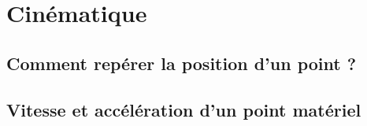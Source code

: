 \documentclass[13pt, twoside, a4paper, french]{report}
\begin{document}
\chapter{Cinématique}\label{ch:cinematique}
  
  
  \section{Comment repérer la position d’un point ?}\label{sec:comment-reperer-la-position-dun-point-?}
  
  
  \section{Vitesse et accélération d’un point matériel}\label{sec:vitesse-et-acceleration-dun-point-materiel}
\end{document}

